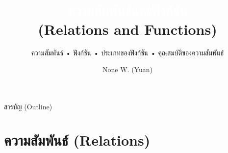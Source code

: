 \documentclass[11pt, aspectratio=169]{beamer}
\title[ความสัมพันธ์และฟังก์ชัน]{\textcolor{white}{ความสัมพันธ์และฟังก์ชัน} \\ \textcolor{boxBlue!60}{(Relations and Functions)}}
\subtitle{ความสัมพันธ์ • ฟังก์ชัน • ประเภทของฟังก์ชัน • คุณสมบัติของความสัมพันธ์ }
\author[None Wanitchollakit]{None W. (Yuan)}
\date{}
\begin{document}
\begin{frame}[plain]
  \titlepage
\end{frame}

\begin{frame}{สารบัญ (Outline)}
  \tableofcontents
\end{frame}

\section{ความสัมพันธ์ (Relations)}
\end{document}
